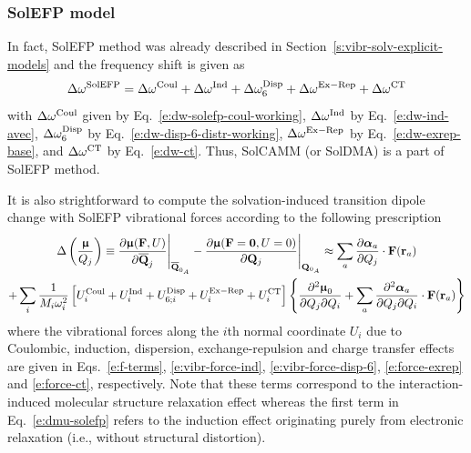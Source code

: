 \documentclass[a4paper,titlepage,twoside,fleqn,12pt]{book}
\newcommand{\BM}[1]{\bm{#1}}
\newcommand{\fderiv}[2]{\ensuremath{
\frac{\partial #1}{\partial #2}}}
\newcommand{\sderivd}[3]{\ensuremath{
\frac{\partial^2 #1}{\partial #2 \partial #3}
}}
\begin{document}
\begin{refsection}
\subsubsection{SolEFP model\label{s:solefp-working-model}}

In fact, SolEFP method was already described in Section~\ref{s:vibr-solv-explicit-models}
and the frequency shift is given as
%
\begin{equation} \label{e:dw-solefp}
\Delta\omega^{\rm SolEFP} = 
\Delta\omega^{\rm Coul} + \Delta\omega^{\rm Ind} + \Delta\omega^{\rm Disp}_6 +
\Delta\omega^{\rm Ex-Rep} + \Delta\omega^{\rm CT}
\end{equation}
%
with $\Delta\omega^{\rm Coul}$ given by Eq.~\eqref{e:dw-solefp-coul-working},  
$\Delta\omega^{\rm Ind}$ by Eq.~\eqref{e:dw-ind-avec},
$\Delta\omega^{\rm Disp}_6$ by Eq.~\eqref{e:dw-disp-6-distr-working},
$\Delta\omega^{\rm Ex-Rep}$ by Eq.~\eqref{e:dw-exrep-base},
and $\Delta\omega^{\rm CT}$ by Eq.~\eqref{e:dw-ct}.
Thus, SolCAMM (or SolDMA) is a part of SolEFP method. 

It is also strightforward to compute the 
solvation\hyp{}induced transition dipole change
with SolEFP vibrational forces according to the following prescription
%
\begin{multline} \label{e:dmu-solefp}
\Delta\left(\frac{{\BM \upmu}}{Q_j}\right) \equiv 
 \frac{\partial{\BM \upmu}({\bf F},U)}{\partial\overline {\bf Q}_j} \Bigg|_{\overline{\bf Q}_{0_A}} -  
 \frac{\partial{\BM \upmu}({\bf F}={\bf 0},U=0)}{\partial {\bf Q}_j} \Bigg|_{{\bf Q}_{0_A}} \approx
%
\sum_a 
\fderiv{{\BM \alpha}_{a}}{Q_j} \cdot {\bf F}({\bf r}_a) \\
+
\sum_i 
\frac{1}{M_i\omega_i^2} 
\left[
 U^{\rm Coul}_i   + 
 U^{\rm Ind}_i    +
 U^{\rm Disp}_{6;i}   +
 U^{\rm Ex-Rep}_i +
 U^{\rm CT}_i
\right]
%
\left\{ 
 \sderivd{{\BM \upmu}_0}{Q_j}{Q_i} 
 + \sum_a \sderivd{{\BM \alpha}_{a}}{Q_j}{Q_i} \cdot {\bf F}({\bf r}_a)
%
\right\}  
\end{multline}
%
where the vibrational forces along the $i$th normal coordinate
$U_i$ due to Coulombic, induction, dispersion, exchange\hyp{}repulsion
and charge transfer effects are given in Eqs.~\eqref{e:f-terms},
\eqref{e:vibr-force-ind}, \eqref{e:vibr-force-disp-6}, 
\eqref{e:force-exrep} and \eqref{e:force-ct}, respectively.
Note that these terms correspond to the interaction\hyp{}induced
molecular structure relaxation effect
whereas the first term in Eq.~\eqref{e:dmu-solefp}
refers to the induction effect originating purely from
electronic relaxation (i.e., without structural distortion).


\end{refsection}
\end{document}
